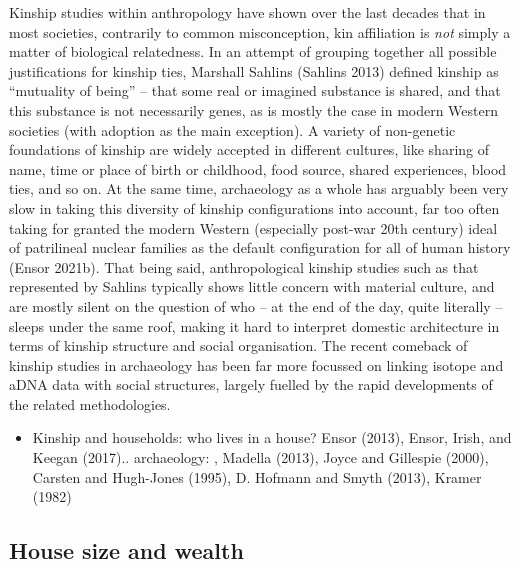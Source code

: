 \documentclass[
  12pt,
  a4paper, twoside]{book}
\providecommand{\tightlist}{%
  \setlength{\itemsep}{0pt}\setlength{\parskip}{0pt}}
\begin{document}
Kinship studies within anthropology have shown over the last decades that in most societies, contrarily to common misconception, kin affiliation is \emph{not} simply a matter of biological relatedness. In an attempt of grouping together all possible justifications for kinship ties, Marshall Sahlins (Sahlins 2013) defined kinship as ``mutuality of being'' -- that some real or imagined substance is shared, and that this substance is not necessarily genes, as is mostly the case in modern Western societies (with adoption as the main exception). A variety of non-genetic foundations of kinship are widely accepted in different cultures, like sharing of name, time or place of birth or childhood, food source, shared experiences, blood ties, and so on. At the same time, archaeology as a whole has arguably been very slow in taking this diversity of kinship configurations into account, far too often taking for granted the modern Western (especially post-war 20th century) ideal of patrilineal nuclear families as the default configuration for all of human history (Ensor 2021b). That being said, anthropological kinship studies such as that represented by Sahlins typically shows little concern with material culture, and are mostly silent on the question of who -- at the end of the day, quite literally -- sleeps under the same roof, making it hard to interpret domestic architecture in terms of kinship structure and social organisation. The recent comeback of kinship studies in archaeology has been far more focussed on linking isotope and aDNA data with social structures, largely fuelled by the rapid developments of the related methodologies.

\begin{itemize}
\tightlist
\item
  Kinship and households: who lives in a house? Ensor (2013), Ensor, Irish, and Keegan (2017).. archaeology: , Madella (2013), Joyce and Gillespie (2000), Carsten and Hugh-Jones (1995), D. Hofmann and Smyth (2013), Kramer (1982)
\end{itemize}

\hypertarget{house-size-and-wealth}{%
\subsection{House size and wealth}\label{house-size-and-wealth}}
\end{document}
